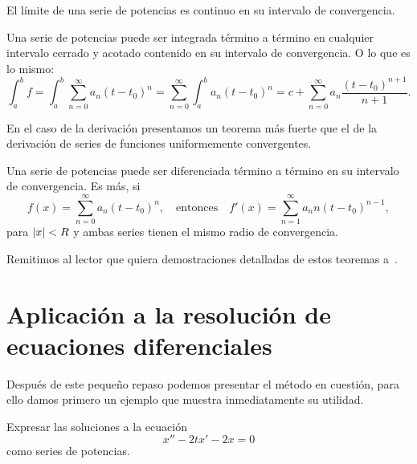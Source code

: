 \documentclass[../ecuaciones_diferenciales.tex]{subfiles}
\begin{document}
\begin{corollary}
	El límite de una serie de potencias es continuo en su intervalo de
	convergencia.
\end{corollary}

\begin{theorem}[Integración]
	Una serie de potencias puede ser integrada término a término en cualquier
	intervalo cerrado y acotado contenido en su intervalo de convergencia. O lo
	que es lo mismo:
	\[\int_a^b f = \int_a^b \sum_{n = 0}^\infty a_n {(t - t_0)}^n
		= \sum_{n = 0}^\infty \int_a^b a_n {(t - t_0)}^n
		= c + \sum_{n = 0}^\infty a_n \frac{{(t - t_0)}^{n + 1}}{n + 1}.\]
\end{theorem}

En el caso de la derivación presentamos un teorema más fuerte que el de la
derivación de series de funciones uniformemente convergentes.

\begin{theorem}[Diferenciación]
	Una serie de potencias puede ser diferenciada término a término en su
	intervalo de convergencia. Es más, si
	\[f(x) = \sum_{n = 0}^\infty a_n {(t - t_0)}^n, \quad \text{entonces} \quad
		f'(x) = \sum_{n = 1}^\infty a_n n {(t - t_0)}^{n - 1},\]
	para \(\abs{x} < R\) y ambas series tienen el mismo radio de convergencia.
\end{theorem}

Remitimos al lector que quiera demostraciones detalladas de estos
teoremas a~\cite[Capítulo~9.4]{introduction_real_analysis}.

\section{Aplicación a la resolución de ecuaciones diferenciales}

Después de este pequeño repaso podemos presentar el método en cuestión, para
ello damos primero un ejemplo que muestra inmediatamente su utilidad.
\begin{example}
	Expresar las soluciones a la ecuación
	\begin{equation} \label{eq:eqpot}
		x''-2tx'-2x=0
	\end{equation}
	como series de potencias.
\end{example}
\end{document}
